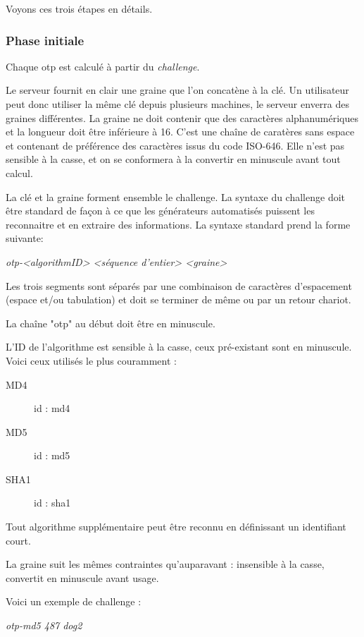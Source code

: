 \documentclass{../res/univ-projet}
\begin{document}
    Voyons ces trois étapes en détails.

    \subsubsection{Phase initiale}
      Chaque otp est calculé à partir du \emph{challenge}.

      Le serveur fournit en clair une graine que l'on concatène à la clé. Un 
utilisateur peut donc utiliser la même clé depuis plusieurs machines, le serveur 
enverra des graines différentes. La graine ne doit contenir que des caractères 
alphanumériques et la longueur doit être inférieure à 16. C'est une chaîne de 
caratères sans espace et contenant de préférence des caractères issus du code 
ISO-646. Elle n'est pas sensible à la casse, et on se conformera à la convertir 
en minuscule avant tout calcul.

      La clé et la graine forment ensemble le challenge. La syntaxe du challenge
doit être standard de façon à ce que les générateurs automatisés puissent les 
reconnaitre et en extraire des informations. La syntaxe standard prend la forme 
suivante:
      \begin{center}
          \emph{otp-<algorithmID> <séquence d'entier> <graine>}\\
      \end{center}
      
      Les trois segments sont séparés par une combinaison de caractères 
d'espacement (espace et/ou tabulation) et doit se terminer de même ou par un 
retour chariot. 

      La chaîne "otp" au début doit être en minuscule.

      L'ID de l'algorithme est sensible à la casse, ceux pré-existant sont en 
      minuscule. Voici ceux utilisés le plus couramment :
      \begin{description}
          \item [MD4] id : md4
          \item [MD5] id : md5
          \item [SHA1] id : sha1 
      \end{description}
      Tout algorithme supplémentaire peut être reconnu en définissant un 
identifiant court.

      La graine suit les mêmes contraintes qu'auparavant : insensible à la 
    casse, convertit en minuscule avant usage.

      Voici un exemple de challenge :
      \begin{center}
          \emph{otp-md5 487 dog2 }\\ 
      \end{center}
\end{document}
